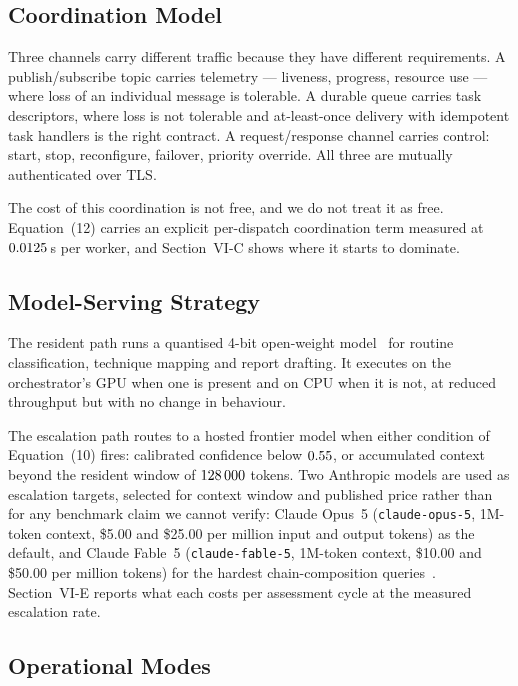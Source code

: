 \documentclass[journal]{IEEEtran}
\begin{document}
\subsection{Coordination Model}

Three channels carry different traffic because they have different
requirements. A publish/subscribe topic carries telemetry --- liveness,
progress, resource use --- where loss of an individual message is tolerable. A
durable queue carries task descriptors, where loss is not tolerable and
at-least-once delivery with idempotent task handlers is the right contract. A
request/response channel carries control: start, stop, reconfigure, failover,
priority override. All three are mutually authenticated over TLS.

The cost of this coordination is not free, and we do not treat it as free.
Equation~(12) carries an explicit per-dispatch coordination term measured at
$0.0125$\,s per worker, and Section~VI-C shows where it starts to dominate.

\subsection{Model-Serving Strategy}

The resident path runs a quantised 4-bit open-weight
model~\cite{touvron2023llama} for routine classification, technique mapping
and report drafting. It executes
on the orchestrator's GPU when one is present and on CPU when it is not, at
reduced throughput but with no change in behaviour.

The escalation path routes to a hosted frontier model when either condition of
Equation~(10) fires: calibrated confidence below $0.55$, or accumulated
context beyond the resident window of $128\,000$ tokens. Two Anthropic models
are used as escalation targets, selected for context window and published
price rather than for any benchmark claim we cannot verify: Claude Opus~5
(\texttt{claude-opus-5}, 1M-token context, \$5.00 and \$25.00 per million
input and output tokens) as the default, and Claude Fable~5
(\texttt{claude-fable-5}, 1M-token context, \$10.00 and \$50.00 per million
tokens) for the hardest chain-composition queries~\cite{anthropicmodels}.
Section~VI-E reports what each costs per assessment cycle at the measured
escalation rate.

\subsection{Operational Modes}
\end{document}
